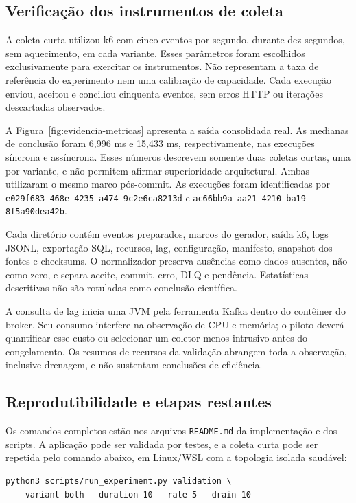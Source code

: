 \subsection{Verificação dos instrumentos de coleta}
A coleta curta utilizou k6 com cinco eventos por segundo, durante dez segundos, sem aquecimento, em cada variante. Esses parâmetros foram escolhidos exclusivamente para exercitar os instrumentos. Não representam a taxa de referência do experimento nem uma calibração de capacidade. Cada execução enviou, aceitou e conciliou cinquenta eventos, sem erros HTTP ou iterações descartadas observados.

A Figura~\ref{fig:evidencia-metricas} apresenta a saída consolidada real. As medianas de conclusão foram 6,996 ms e 15,433 ms, respectivamente, nas execuções síncrona e assíncrona. Esses números descrevem somente duas coletas curtas, uma por variante, e não permitem afirmar superioridade arquitetural. Ambas utilizaram o mesmo marco pós-commit. As execuções foram identificadas por \texttt{e029f683-468e-4235-a474-9c2e6ca8213d} e \texttt{ac66bb9a-aa21-4210-ba19-8f5a90dea42b}.


Cada diretório contém eventos preparados, marcos do gerador, saída k6, logs JSONL, exportação SQL, recursos, lag, configuração, manifesto, snapshot dos fontes e checksums. O normalizador preserva ausências como dados ausentes, não como zero, e separa aceite, commit, erro, DLQ e pendência. Estatísticas descritivas não são rotuladas como conclusão científica.

A consulta de lag inicia uma JVM pela ferramenta Kafka dentro do contêiner do broker. Seu consumo interfere na observação de CPU e memória; o piloto deverá quantificar esse custo ou selecionar um coletor menos intrusivo antes do congelamento. Os resumos de recursos da validação abrangem toda a observação, inclusive drenagem, e não sustentam conclusões de eficiência.

\subsection{Reprodutibilidade e etapas restantes}
Os comandos completos estão nos arquivos \texttt{README.md} da implementação e dos scripts. A aplicação pode ser validada por testes, e a coleta curta pode ser repetida pelo comando abaixo, em Linux/WSL com a topologia isolada saudável:
\begin{Verbatim}[fontsize=\small,breaklines=true,frame=single]
python3 scripts/run_experiment.py validation \
  --variant both --duration 10 --rate 5 --drain 10
\end{Verbatim}

